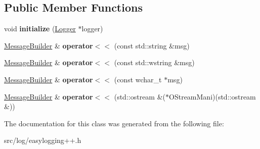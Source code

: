 \subsection*{Public Member Functions}
\begin{DoxyCompactItemize}
\item 
void {\bfseries initialize} (\hyperlink{classel_1_1Logger}{Logger} $\ast$logger)\hypertarget{classel_1_1base_1_1MessageBuilder_a61729d9b620eb7b3e6ac1af69364553c}{}\label{classel_1_1base_1_1MessageBuilder_a61729d9b620eb7b3e6ac1af69364553c}

\item 
\hyperlink{classel_1_1base_1_1MessageBuilder}{Message\+Builder} \& {\bfseries operator$<$$<$} (const std\+::string \&msg)\hypertarget{classel_1_1base_1_1MessageBuilder_a740a968d7f2901d49a2e1c348cfea7bf}{}\label{classel_1_1base_1_1MessageBuilder_a740a968d7f2901d49a2e1c348cfea7bf}

\item 
\hyperlink{classel_1_1base_1_1MessageBuilder}{Message\+Builder} \& {\bfseries operator$<$$<$} (const std\+::wstring \&msg)\hypertarget{classel_1_1base_1_1MessageBuilder_ad04c5d0a8fc38662ede9aaa742912a42}{}\label{classel_1_1base_1_1MessageBuilder_ad04c5d0a8fc38662ede9aaa742912a42}

\item 
\hyperlink{classel_1_1base_1_1MessageBuilder}{Message\+Builder} \& {\bfseries operator$<$$<$} (const wchar\+\_\+t $\ast$msg)\hypertarget{classel_1_1base_1_1MessageBuilder_a42c2a21a6bebb2ad52d22da054cd8f49}{}\label{classel_1_1base_1_1MessageBuilder_a42c2a21a6bebb2ad52d22da054cd8f49}

\item 
\hyperlink{classel_1_1base_1_1MessageBuilder}{Message\+Builder} \& {\bfseries operator$<$$<$} (std\+::ostream \&($\ast$O\+Stream\+Mani)(std\+::ostream \&))\hypertarget{classel_1_1base_1_1MessageBuilder_a884b9fd5f742f5fa25bbc78d3415a674}{}\label{classel_1_1base_1_1MessageBuilder_a884b9fd5f742f5fa25bbc78d3415a674}

\end{DoxyCompactItemize}


The documentation for this class was generated from the following file\+:\begin{DoxyCompactItemize}
\item 
src/log/easylogging++.\+h\end{DoxyCompactItemize}
